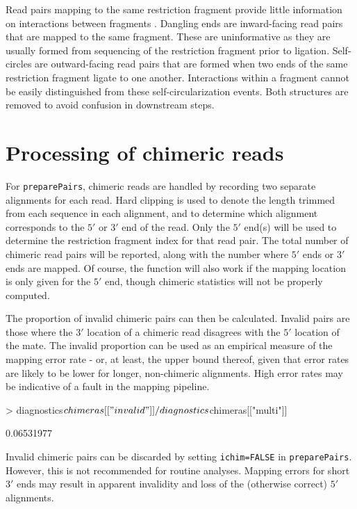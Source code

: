 \documentclass[12pt]{report}
\renewenvironment{Schunk}{\vspace{0pt}}{\vspace{0pt}}
\newcommand{\code}[1]{{\small\texttt{#1}}}
\begin{document}
Read pairs mapping to the same restriction fragment provide little information on interactions between fragments \citep{belton2012hic}.
Dangling ends are inward-facing read pairs that are mapped to the same fragment.
These are uninformative as they are usually formed from sequencing of the restriction fragment prior to ligation.
Self-circles are outward-facing read pairs that are formed when two ends of the same restriction fragment ligate to one another.
Interactions within a fragment cannot be easily distinguished from these self-circularization events.
Both structures are removed to avoid confusion in downstream steps.

\section{Processing of chimeric reads}
For \code{preparePairs}, chimeric reads are handled by recording two separate alignments for each read.
Hard clipping is used to denote the length trimmed from each sequence in each alignment, and to determine which alignment corresponds to the $5'$ or $3'$ end of the read.
Only the $5'$ end(s) will be used to determine the restriction fragment index for that read pair.
The total number of chimeric read pairs will be reported, along with the number where $5'$ ends or $3'$ ends are mapped.
Of course, the function will also work if the mapping location is only given for the $5'$ end, though chimeric statistics will not be properly computed.

The proportion of invalid chimeric pairs can then be calculated.
Invalid pairs are those where the $3'$ location of a chimeric read disagrees with the $5'$ location of the mate.
The invalid proportion can be used as an empirical measure of the mapping error rate - or, at least, the upper bound thereof, given that error rates are likely to be lower for longer, non-chimeric alignments.
High error rates may be indicative of a fault in the mapping pipeline.

\begin{Schunk}
\begin{Sinput}
> diagnostics$chimeras[["invalid"]]/diagnostics$chimeras[["multi"]]
\end{Sinput}
\begin{Soutput}
[1] 0.06531977
\end{Soutput}
\end{Schunk}

Invalid chimeric pairs can be discarded by setting \code{ichim=FALSE} in \code{preparePairs}.
However, this is not recommended for routine analyses.
Mapping errors for short $3'$ ends may result in apparent invalidity and loss of the (otherwise correct) $5'$ alignments.
\end{document}

